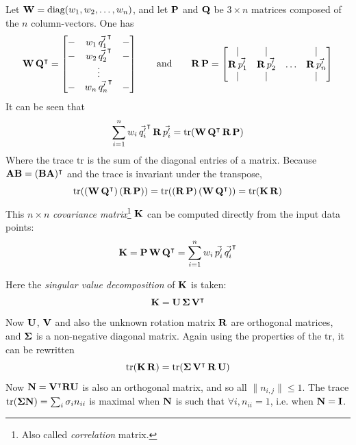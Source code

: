Let $\mathbf{W} = \text{diag}(w_1, w_2, \dots, w_n)$, and let $\mathbf{P}$ and $\mathbf{Q}$ be $3 \times n$ matrices composed of the $n$ column-vectors. One has
\begin{equation}
\mathbf{W} \, \mathbf{Q}^\intercal = \left[ \begin{matrix}
	\-- & w_1 \, \vec{q'_1}^\intercal & \--\\
	\-- & w_2 \, \vec{q'_2}^\intercal & \--\\
	& \vdots & \\
	\-- & w_n \, \vec{q'_n}^\intercal & \--
\end{matrix} \right]
\hspace{7mm} \text{and} \hspace{7mm}
\mathbf{R} \, \mathbf{P} = \left[ \begin{matrix}
	| & | & & |\\
	\mathbf{R} \, \vec{p'_1} & \mathbf{R} \, \vec{p'_2} & \hdots & \mathbf{R} \, \vec{p'_n}\\
	| & | & & |
\end{matrix} \right]
\end{equation}
It can be seen that
\begin{equation}
\sum_{i=1}^{n} w_i \, \vec{q'_i}^\intercal \, \mathbf{R} \, \vec{p'_i} = \text{tr}(\mathbf{W} \, \mathbf{Q}^\intercal \, \mathbf{R} \, \mathbf{P})
\end{equation}
Where the trace $\text{tr}$ is the sum of the diagonal entries of a matrix. Because $\mathbf{A} \mathbf{B} = (\mathbf{B} \mathbf{A})^\intercal$ and the trace is invariant under the transpose,
\begin{equation}
\text{tr}((\mathbf{W} \, \mathbf{Q}^\intercal) \, (\mathbf{R} \, \mathbf{P})) = \text{tr}((\mathbf{R} \, \mathbf{P}) \, (\mathbf{W} \, \mathbf{Q}^\intercal)) = \text{tr}(\mathbf{K} \, \mathbf{R})
\end{equation}
This $n \times n$ \emph{covariance matrix}\footnote{Also called \emph{correlation} matrix.} $\mathbf{K}$ can be computed directly from the input data points:
\begin{equation}
\mathbf{K} = \mathbf{P} \, \mathbf{W} \, \mathbf{Q}^\intercal = \sum_{i=1}^{n} w_i \, \vec{p'_i} \, \vec{q'_i}^\intercal
\end{equation}

Here the \emph{singular value decomposition} of $\mathbf{K}$ is taken:
\begin{equation}
\mathbf{K} = \mathbf{U} \, \mathbf{\Sigma} \, \mathbf{V}^\intercal
\end{equation}
Now $\mathbf{U}$, $\mathbf{V}$ and also the unknown rotation matrix $\mathbf{R}$ are orthogonal matrices, and $\mathbf{\Sigma}$ is a non-negative diagonal matrix. Again using the properties of the $\text{tr}$, it can be rewritten
\begin{equation}
\text{tr}(\mathbf{K} \, \mathbf{R}) = \text{tr}(\mathbf{\Sigma} \, \mathbf{V}^\intercal \, \mathbf{R} \, \mathbf{U})
\end{equation}
Now $\mathbf{N} = \mathbf{V}^\intercal \mathbf{R} \mathbf{U}$ is also an orthogonal matrix, and so all $\| n_{i,j} \| \leq 1$. The trace $\text{tr}(\mathbf{\Sigma} \mathbf{N}) = \sum_{i} \sigma_i n_{ii}$ is maximal when $\mathbf{N}$ is such that $\forall i, n_{ii} = 1$, i.e. when $\mathbf{N} = \mathbf{I}$.

